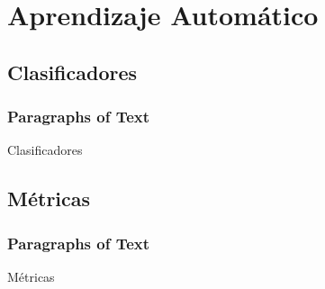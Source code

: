 \section{Aprendizaje Automático} %

\subsection{Clasificadores}
\begin{frame}
\frametitle{Paragraphs of Text}
Clasificadores
\end{frame}

\subsection{Métricas}
\begin{frame}
\frametitle{Paragraphs of Text}
Métricas
\end{frame}